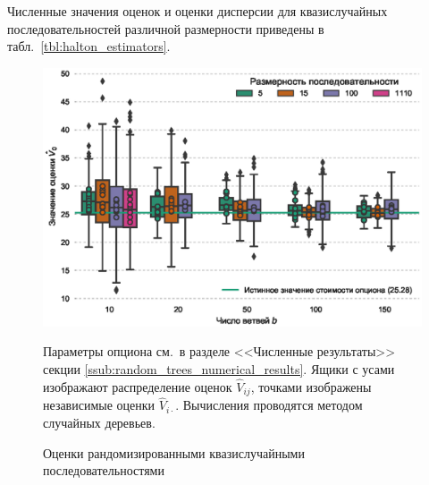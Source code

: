 \documentclass[specialist,
               substylefile = ../spbu.rtx,
               subf,href,colorlinks=true, 12pt]{disser}
\newcommand{\Vhat}{\hat{V}}
\begin{document}

Численные значения оценок и оценки дисперсии для квазислучайных последовательностей различной размерности приведены в табл.~\ref{tbl:halton_estimators}. 


\begin{figure}[h]
    \centering
	\includegraphics[width=\textwidth]{halton_estimators.eps}
	\caption{Оценки рандомизированными квазислучайными последовательностями}
	\footnotesize Параметры опциона см.~в разделе <<Численные результаты>> секции \ref{ssub:random_trees_numerical_results}. Ящики с усами изображают распределение оценок $\Vhat_{ij}$, точками изображены независимые оценки $\Vhat_{i\cdot}$. Вычисления проводятся методом случайных деревьев.
	\label{fig:halton_estimators}
\end{figure}
\end{document}

